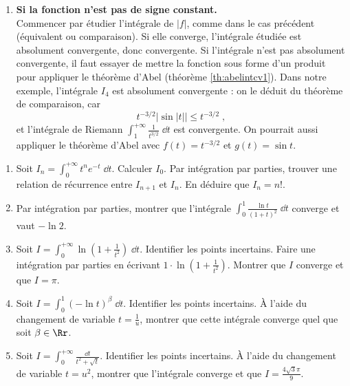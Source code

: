 \documentclass[class=report,crop=false]{standalone}
\begin{document}
\begin{enumerate}
\item \textbf{Si la fonction n'est pas de signe constant.}\\
Commencer par étudier l'intégrale de $|f|$, comme dans le cas
précédent (équivalent ou comparaison). Si elle converge,
l'intégrale étudiée est absolument convergente, donc
convergente. Si l'intégrale n'est pas absolument convergente, il
faut essayer de mettre la fonction sous forme d'un produit pour
appliquer le théorème d'Abel (théorème \ref{th:abelintcv1}). Dans notre
exemple, l'intégrale $I_4$ est absolument convergente : on le
déduit du théorème de comparaison, car
$$
t^{-3/2} \big|\sin |t| \big|\le t^{-3/2}\;, 
$$
et l'intégrale de Riemann $\int_1^{+\infty} \frac{1}{t^{3/2}}\;\dd t$ est
convergente. On pourrait aussi appliquer le théorème d'Abel
avec $f(t) = t^{-3/2}$ et $g(t) = \sin t$.
\end{enumerate}


\begin{miniexercices} 
\begin{enumerate}
  \item Soit $I_n = \int_0^{+\infty} t^n e^{-t}\;\dd t$. 
  Calculer $I_0$. Par intégration par parties, trouver une relation de 
  récurrence entre $I_{n+1}$ et $I_n$. En déduire que $I_n = n!$.
  
  \item Par intégration par parties, montrer que l'intégrale
  $\int_0^1 \frac{\ln t}{(1+t)^2}\; \dd t$ converge et vaut $-\ln 2$.
  
  \item Soit $I= \int_0^{+\infty} \ln(1+\frac{1}{t^2}) \;\dd t$. Identifier les points incertains.
  Faire une intégration par parties en écrivant $1\cdot \ln(1+\frac{1}{t^2})$. Montrer que $I$ converge
  et que $I = \pi$. 
  
  \item Soit $I=\int_0^1 \left(-\ln t\right)^\beta \;\dd t$.
  Identifier les points incertains. 
  \`A l'aide du changement de variable $t=\frac 1u$, montrer que cette intégrale
  converge quel que soit $\beta \in \Rr$.
  
  \item Soit $I=\int_0^{+\infty}\frac{\dd t}{t^2+\sqrt t}$.
  Identifier les points incertains. 
  \`A l'aide du changement de variable $t=u^2$, montrer que l'intégrale
  converge et que $I = \frac{4\sqrt3\pi}{9}$.


\end{enumerate}
\end{miniexercices}
\end{document}
